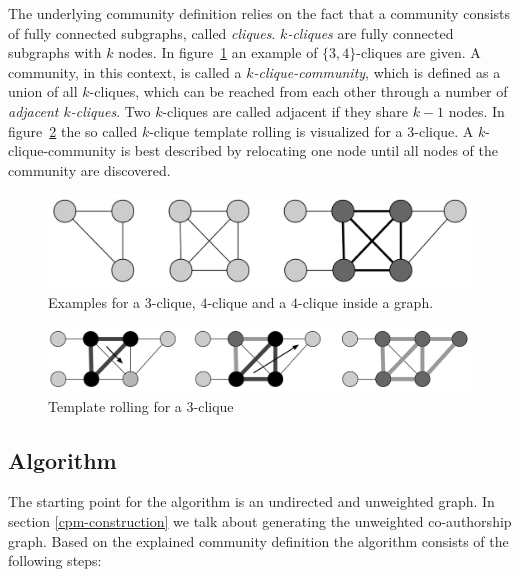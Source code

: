 \documentclass[runningheads,a4paper]{llncs}
\begin{document}
The underlying community definition relies on the fact that a community consists of fully connected subgraphs, called \emph{cliques}.
\emph{$k$-cliques} are fully connected subgraphs with $k$ nodes.
In figure~\ref{fig:cliques} an example of $\{3,4\}$-cliques are given.
A community, in this context, is called a \emph{$k$-clique-community}, which is defined as a union of all $k$-cliques, which can be reached from each other through a number of \emph{adjacent $k$-cliques}.
Two $k$-cliques are called adjacent if they share $k-1$ nodes.
In figure~\ref{fig:rolling} the so called $k$-clique template rolling is visualized for a $3$-clique.
A $k$-clique-community is best described by relocating one node until all nodes of the community are discovered.

\begin{figure}
	\includegraphics[width=\textwidth]{img/cliques.png}
    \caption{Examples for a $3$-clique, $4$-clique and a $4$-clique inside a graph.}
    \label{fig:cliques}
\end{figure}

\begin{figure}
	\includegraphics[width=\textwidth]{img/rolling.png}
	\caption{Template rolling for a $3$-clique}
	\label{fig:rolling}
\end{figure}

\subsection{Algorithm}
\label{cpm-algo}
The starting point for the algorithm is an undirected and unweighted graph. In section \ref{cpm-construction} we talk about generating the  unweighted co-authorship graph.
Based on the explained community definition the algorithm consists of the following steps:

\medskip
\end{document}
